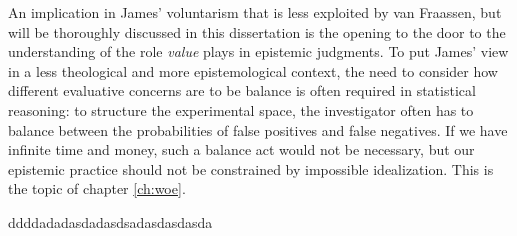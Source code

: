 An implication in  James' voluntarism that is less exploited by van Fraassen, but will be thoroughly discussed in this dissertation is the opening to the door to the understanding of the role \emph{value} plays in epistemic judgments. To put James' view in a less theological and more epistemological context, the need to consider how different evaluative concerns are to be balance is often required in statistical reasoning: to structure the experimental space, the investigator often has to balance between the probabilities of false positives and false negatives. If we have infinite time and money, such a balance act would not be necessary, but our epistemic practice should not be constrained by impossible idealization. This is the topic of chapter \ref{ch:woe}.




ddddadadasdadasdsadasdasdasda